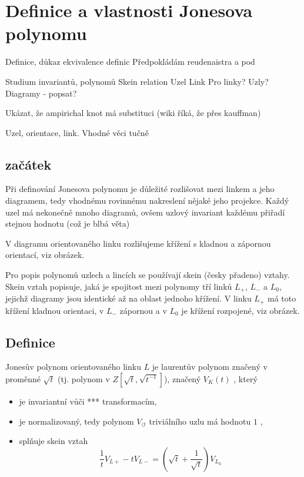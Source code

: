 
\chapter{Definice a vlastnosti Jonesova polynomu}




Definice, důkaz ekvivalence definic
Předpokládám reudenaistra a pod

Studium invariantů, polynomů
Skein relation
Uzel
Link
Pro linky? Uzly?
Diagramy - popsat?

Ukázat, že ampirichal knot má substituci (wiki říká, že přes kauffman)

Uzel, orientace, link.
Vhodné věci tučně

\section{začátek}

Při definování Jonesova polynomu je důležité rozlišovat mezi linkem a jeho diagramem, tedy vhodnému rovinnému nakreslení nějaké jeho projekce. Každý uzel má nekonečně mnoho diagramů, ovšem uzlový invariant každému přiřadí stejnou hodnotu (což je blbá věta)

V diagramu orientovaného linku rozlišujeme křížení s kladnou a zápornou orientací, viz obrázek.

Pro popis polynomů uzlech a lincích se používají skein (česky přadeno) vztahy.
Skein vztah popisuje, jaká je spojitost mezi polynomy tří linků $L_+$, $ L_-$ a $L_0$, jejichž diagramy jsou identické až na oblast jednoho křížení. V linku $L_+$ má toto křížení kladnou orientaci, v $L_-$ zápornou a v $L_0$ je křížení rozpojené, viz obrázek.

\section{Definice}

\begin{definice}\label{def01:1}
Jonesův polynom orientovaného linku $L$ je laurentův polynom značený v proměnné $\sqrt t$ (tj. polynom v $Z[\sqrt t, \sqrt{t^{-1}}]$), značený $V_K(t)$ , který
\begin{itemize}
\item
je invariantní vůči *** transformacím,
\item 
  je normalizovaný, tedy polynom  $V_\circlearrowleft$ triviálního uzlu má hodnotu $1$ ,
\item  
splňuje skein vztah 
$$ \frac{1}{t} V_{L+} - t V_{L-} = (\sqrt{t}  + \frac{1}{\sqrt{t}}) V_{L_0}$$
\end{itemize}
\end{definice}

